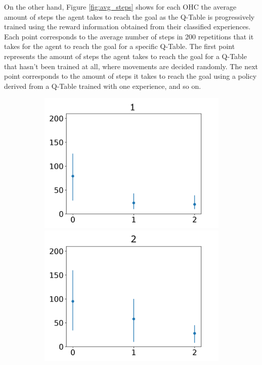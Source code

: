 \documentclass[journal]{IEEEtran}
\begin{document}
{{On the other hand, Figure \ref{fig:avg_steps} shows for each OHC the average amount of steps the agent takes to reach the goal as the Q-Table is progressively trained using the reward information obtained from their classified experiences. Each point corresponds to the average number of steps in 200 repetitions that it takes for the agent to reach the goal for a specific Q-Table. The first point represents the amount of steps the agent takes to reach the goal for a Q-Table that hasn't been trained at all, where movements are decided randomly. The next point corresponds to the amount of steps it takes to reach the goal using a policy derived from a Q-Table trained with one experience, and so on.

\begin{figure}[h!]
\begin{subfigure}{0.5\textwidth}
\centering
\includegraphics[scale=0.27]{Images/Average_steps/a.png}
\includegraphics[scale=0.27]{Images/Average_steps/b.png}

\end{subfigure}
\end{figure}}}
\end{document}
